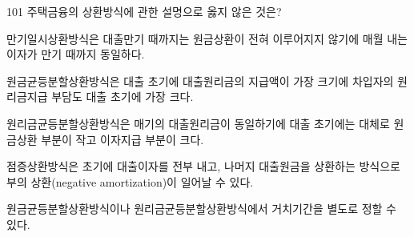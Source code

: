 \begin{question}{101}
주택금융의 상환방식에 관한 설명으로 옳지 않은 것은?
\begin{choices}
  \item 만기일시상환방식은 대출만기 때까지는 원금상환이 전혀 이루어지지 않기에 매월 내는 이자가 만기 때까지 동일하다.
  \item 원금균등분할상환방식은 대출 초기에 대출원리금의 지급액이 가장 크기에 차입자의 원리금지급 부담도 대출 초기에 가장 크다.
  \item 원리금균등분할상환방식은 매기의 대출원리금이 동일하기에 대출 초기에는 대체로 원금상환 부분이 작고 이자지급 부분이 크다.
  \item 점증상환방식은 초기에 대출이자를 전부 내고, 나머지 대출원금을 상환하는 방식으로 부의 상환(negative amortization)이 일어날 수 있다.
  \item 원금균등분할상환방식이나 원리금균등분할상환방식에서 거치기간을 별도로 정할 수 있다.
\end{choices}
\end{question}
